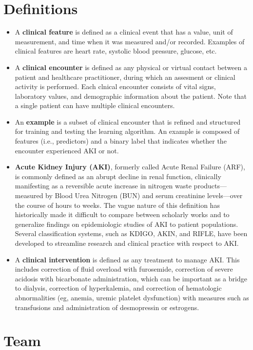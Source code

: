 \documentclass[
   technote
]{phildoc}
\newcommand{\ie}{i.e.,}
\begin{document}
\section{Definitions}
\begin{itemize}
\item A \textbf{clinical feature} is defined as a clinical event that has a value, unit of measurement, and time when it was measured and/or recorded. Examples of clinical features are heart rate, systolic blood pressure, glucose, etc. 
\item A \textbf{clinical encounter} is defined as any physical or virtual contact between a patient and healthcare practitioner, during which an assesment or clinical activity is performed. Each clnical encounter consists of vital signs, laboratory values, and demographic information about the patient. Note that a single patient can have multiple clinical encounters.
\item An \textbf{example} is a subset of clinical encounter that is refined and structured for training and testing the learning algorithm. An example is composed of features (\ie{} predictors) and a binary label that indicates whether the encounter experienced AKI or not.
\item \textbf{Acute Kidney Injury (AKI)}, formerly called Acute Renal Failure (ARF), is commonly defined as an abrupt decline in renal function, clinically manifesting as a reversible acute increase in nitrogen waste products—measured by Blood Urea Nitrogen (BUN) and serum creatinine levels—over the course of hours to weeks. The vague nature of this definition has historically made it difficult to compare between scholarly works and to generalize findings on epidemiologic studies of AKI to patient populations. Several classification systems, such as KDIGO, AKIN, and RIFLE, have been developed to streamline research and clinical practice with respect to AKI. 
\item A \textbf{clinical intervention} is defined as any treatment to manage AKI. This includes correction of fluid overload with furosemide, correction of severe acidosis with bicarbonate administration, which can be important as a bridge to dialysis, correction of hyperkalemia, and correction of hematologic abnormalities (eg, anemia, uremic platelet dysfunction) with measures such as transfusions and administration of desmopressin or estrogens.
\end{itemize}

\section{Team}
\end{document}
